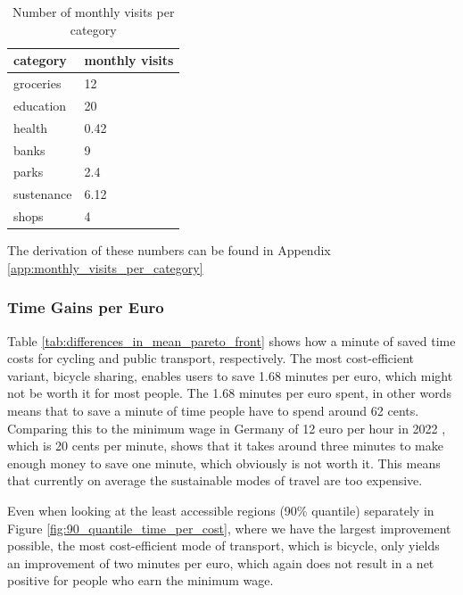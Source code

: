 \begin{table}
  \caption{Number of monthly visits per category}
  \label{tab:monthly_visits}
  \begin{center}
    \begin{tabular}[c]{l|l}
      category & monthly visits \\
      \hline
      groceries & 12 \\
      education & 20 \\
      health & 0.42 \\
      banks & 9 \\
      parks & 2.4 \\
      sustenance & 6.12 \\
      shops & 4 \\
      \hline
    \end{tabular}
  \end{center}
\end{table}

The derivation of these numbers can be found in Appendix \ref{app:monthly_visits_per_category}


\subsubsection{Time Gains per Euro}

Table \ref{tab:differences_in_mean_pareto_front} shows how a minute of saved time costs for cycling and public transport, respectively.
The most cost-efficient variant, bicycle sharing, enables users to save 1.68 minutes per euro, which might not be worth it for most people.
The 1.68 minutes per euro spent, in other words means that to save a minute of time people have to spend around 62 cents.
Comparing this to the minimum wage in Germany of 12 euro per hour in 2022 \cite{federalstatisticalofficegermanyMinimumWages}, which is 20 cents per minute, shows that it takes around three minutes to make enough money to save one minute, which obviously is not worth it.
This means that currently on average the sustainable modes of travel are too expensive.

Even when looking at the least accessible regions (90\% quantile) separately in Figure \ref{fig:90_quantile_time_per_cost}, where we have the largest improvement possible, the most cost-efficient mode of transport, which is bicycle, only yields an improvement of two minutes per euro, which again does not result in a net positive for people who earn the minimum wage.



